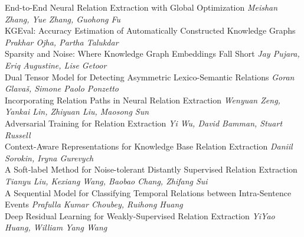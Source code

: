 \documentclass{book}
\begin{document}
    \noindent	End-to-End Neural Relation Extraction with Global Optimization \newline 
    {\itshape Meishan Zhang, Yue Zhang, Guohong Fu} \\
    
    \noindent	KGEval: Accuracy Estimation of Automatically Constructed Knowledge Graphs \newline 
    {\itshape Prakhar Ojha, Partha Talukdar} \\
    
    \noindent	Sparsity and Noise: Where Knowledge Graph Embeddings Fall Short \newline 
    {\itshape Jay Pujara, Eriq Augustine, Lise Getoor} \\
    
    \noindent	Dual Tensor Model for Detecting Asymmetric Lexico-Semantic Relations \newline 
    {\itshape Goran Glavaš, Simone Paolo Ponzetto} \\
    
    \noindent	Incorporating Relation Paths in Neural Relation Extraction \newline 
    {\itshape Wenyuan Zeng, Yankai Lin, Zhiyuan Liu, Maosong Sun} \\
    
    \noindent	Adversarial Training for Relation Extraction \newline 
    {\itshape Yi Wu, David Bamman, Stuart Russell} \\
    
    \noindent	Context-Aware Representations for Knowledge Base Relation Extraction \newline 
    {\itshape Daniil Sorokin, Iryna Gurevych} \\
    
    \noindent	A Soft-label Method for Noise-tolerant Distantly Supervised Relation Extraction \newline 
    {\itshape Tianyu Liu, Kexiang Wang, Baobao Chang, Zhifang Sui} \\
    
    \noindent	A Sequential Model for Classifying Temporal Relations between Intra-Sentence Events \newline 
    {\itshape Prafulla Kumar Choubey, Ruihong Huang} \\
    
    \noindent	Deep Residual Learning for Weakly-Supervised Relation Extraction \newline 
    {\itshape YiYao Huang, William Yang Wang} \\
    
\end{document}
